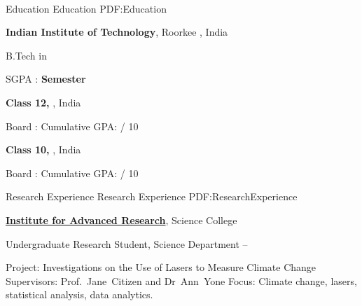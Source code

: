 \documentclass[letterpaper,MMMyyyy,nonstopmode]{simpleresumecv}
\newcommand{\CVAuthor}{\VAR{student.name}}
\begin{document}

\Title{\CVAuthor}

\begin{SubTitle}
\par
{}
\,\SubBulletSymbol\,
\,\SubBulletSymbol\,
\href{mailto:\VAR{student.email}}
{}
\,\SubBulletSymbol\,
\,\SubBulletSymbol\,
\end{SubTitle}

\begin{Body}


\Section
{Education}
{Education}
{PDF:Education}

\Entry
\textbf{Indian Institute of Technology},
Roorkee , India

\Gap
\BulletItem
{B.Tech in }
\begin{Detail}
\SubBulletItem
SGPA : {}
\hfill
\textbf{ Semester}
\end{Detail}


\BigGap
\Entry
\textbf{Class 12, },
India

\Gap
\BulletItem
Board : 
\hfill
{}
\BulletItem
Cumulative GPA:  / 10

\BigGap
\Entry
\textbf{Class 10, },
India

\Gap
\BulletItem
Board : 
\hfill
{}
\BulletItem
Cumulative GPA:  / 10


\Section
{Research Experience}
{Research Experience}
{PDF:ResearchExperience}

\Entry
\href{http://www.example.com/my-institute}
{\textbf{Institute for Advanced Research}},
Science College

\Gap
\BulletItem
Undergraduate Research Student, Science Department
\hfill
{} --
\begin{Detail}
\SubBulletItem
Project:
Investigations on the Use of Lasers to Measure Climate Change
\SubBulletItem
Supervisors:
Prof.~Jane~Citizen and
Dr~Ann~Yone
\SubBulletItem
Focus:
Climate change, lasers, statistical analysis, data analytics.
\end{Detail}



\end{Body}
\end{document}
